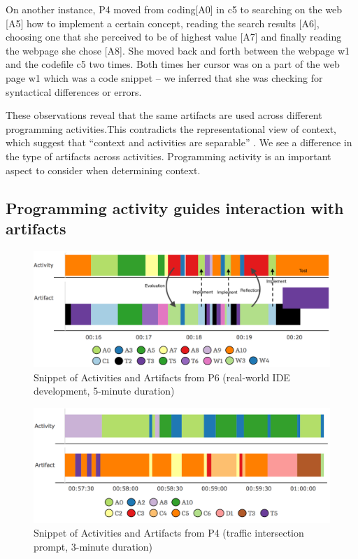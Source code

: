 On another instance, P4 moved from coding[A0] in c5 to searching on the web [A5] how to implement a certain concept, reading the search results [A6], choosing one that she perceived to be of highest value [A7] and finally reading the webpage she chose [A8]. She moved back and forth between the webpage w1 and the codefile c5 two times. Both times her cursor was on a part of the web page w1 which was a code snippet -- we inferred that she was checking for syntactical differences or errors. 

These observations reveal that the same artifacts are used across different programming activities.This contradicts the representational view of context, which suggest that ``context and activities are separable'' \cite{Dourish:2004,Gasparic:2017}. We see a difference in the type of artifacts across activities. Programming activity is an important aspect to consider when determining context. 



\subsection{Programming activity guides interaction with artifacts}

\begin{figure}
\includegraphics[width=1.98\columnwidth]{figures/P6timeplot}
\caption{Snippet of Activities and Artifacts from P6 (real-world IDE development, 5-minute duration)}
\label{P6Fig}
\end{figure}


\begin{figure}
\includegraphics[width=\columnwidth]{figures/P4timeplot}
\caption{Snippet of Activities and Artifacts from P4 (traffic intersection prompt, 3-minute duration)}
\label{P4Fig}
\end{figure}

